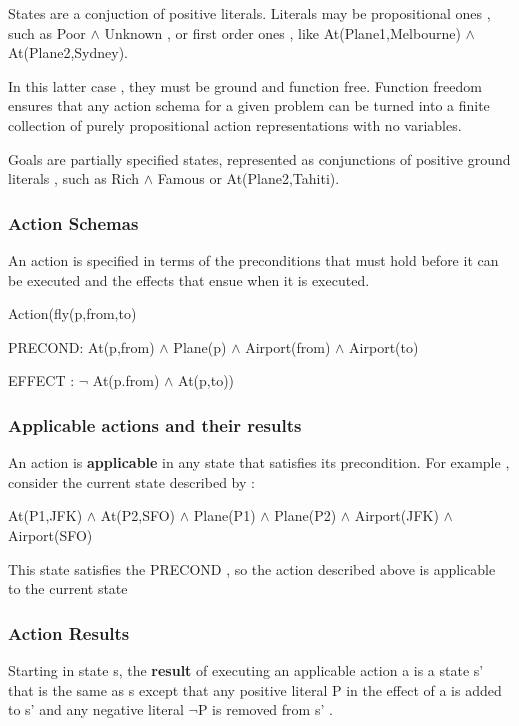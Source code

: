 \documentclass{article}
\begin{document}
States are a conjuction of positive literals. Literals may be propositional ones , such as Poor $\land$ Unknown , or first order ones , like At(Plane1,Melbourne) $\land$ At(Plane2,Sydney).

In this latter case , they must be ground and function free. Function freedom ensures that any action schema for a given problem can be turned into a finite collection of purely propositional action representations with no variables.

Goals are partially specified states, represented as conjunctions of positive ground literals , such as Rich $\land$ Famous or At(Plane2,Tahiti).

\subsubsection{Action Schemas}

An action is specified in terms of the preconditions that must hold before it can be executed and the effects that ensue when it is executed.

Action(fly(p,from,to)

PRECOND: At(p,from) $\land$ Plane(p) $\land$ Airport(from) $\land$ Airport(to)

EFFECT : $\neg$ At(p.from) $\land$ At(p,to))

\subsubsection{Applicable actions and their results}

An action is \textbf{applicable} in any state that satisfies its precondition. For example , consider the current state described by : 

At(P1,JFK) $\land$ At(P2,SFO) $\land$ Plane(P1) $\land$ Plane(P2)  $\land$ Airport(JFK) $\land$ Airport(SFO)

This state satisfies the PRECOND , so the action described above is applicable to the current state

\subsubsection{Action Results}

Starting in state s, the \textbf{result} of executing an applicable action a is a state s' that is the same as s except that any positive literal P in the effect of a is added to s' and any negative literal $\neg$P is removed from s' .
\end{document}
